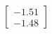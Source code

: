 \documentclass[preview]{standalone}
\begin{document}
\begin{align*}
\begin{bmatrix} -1.51 \\ -1.48 \end{bmatrix}
\end{align*}
\end{document}
